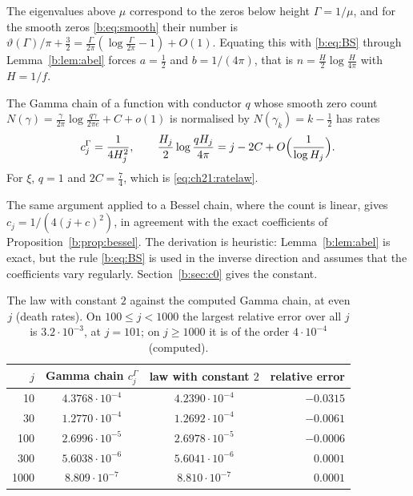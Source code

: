 The eigenvalues above $\mu$ correspond to the zeros below height $\Gamma=1/\mu$, and for the smooth zeros \eqref{b:eq:smooth} their number is $\vartheta(\Gamma)/\pi+\frac32=\frac{\Gamma}{2\pi}(\log\frac{\Gamma}{2\pi}-1)+O(1)$. Equating this with \eqref{b:eq:BS} through Lemma~\ref{b:lem:abel} forces $a=\frac12$ and $b=1/(4\pi)$, that is $n=\frac{H}{2}\log\frac{H}{4\pi}$ with $H=1/f$.

\begin{conjecture}\label{b:conj:bs}\label{b:prop:bs}\label{b:prop:bs2}
The Gamma chain of a function with conductor $q$ whose smooth zero count $N(\gamma)=\frac\gamma{2\pi}\log\frac{q\gamma}{2\pi e}+C+o(1)$ is normalised by $N(\gamma_k)=k-\frac12$ has rates
\[
c_j^\Gamma=\frac1{4H_j^2},\qquad \frac{H_j}2\log\frac{qH_j}{4\pi}=j-2C+O\Bigl(\frac1{\log H_j}\Bigr).
\]
For $\xi$, $q=1$ and $2C=\frac74$, which is \eqref{eq:ch21:ratelaw}.
\end{conjecture}

The same argument applied to a Bessel chain, where the count is linear, gives $c_j=1/(4(j+c)^2)$, in agreement with the exact coefficients of Proposition~\ref{b:prop:bessel}. The derivation is heuristic: Lemma~\ref{b:lem:abel} is exact, but the rule \eqref{b:eq:BS} is used in the inverse direction and assumes that the coefficients vary regularly. Section~\ref{b:sec:c0} gives the constant.

\begin{table}[ht]
\centering\small
\begin{tabular}{@{}rccr@{}}
\toprule
$j$ & Gamma chain $c_j^\Gamma$ & law with constant $2$ & relative error\\
\midrule
10 & $4.3768\cdot10^{-4}$ & $4.2390\cdot10^{-4}$ & $-0.0315$\\
30 & $1.2770\cdot10^{-4}$ & $1.2692\cdot10^{-4}$ & $-0.0061$\\
100 & $2.6996\cdot10^{-5}$ & $2.6978\cdot10^{-5}$ & $-0.0006$\\
300 & $5.6038\cdot10^{-6}$ & $5.6041\cdot10^{-6}$ & $0.0001$\\
1000 & $8.809\cdot10^{-7}$ & $8.810\cdot10^{-7}$ & $0.0001$\\
\bottomrule
\end{tabular}
\caption{The law with constant $2$ against the computed Gamma chain, at even $j$ (death rates). On $100\le j<1000$ the largest relative error over all $j$ is $3.2\cdot10^{-3}$, at $j=101$; on $j\ge1000$ it is of the order $4\cdot10^{-4}$ (computed).}\label{b:tab:law}
\end{table}

